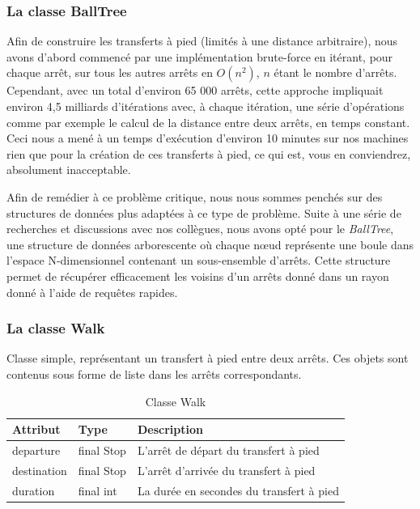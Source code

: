 \documentclass[12pt]{article}
\begin{document}
\subsubsection{La classe BallTree}
Afin de construire les transferts à pied (limités à une distance arbitraire), nous avons d'abord commencé par une implémentation brute-force en itérant, pour chaque arrêt, sur tous les
autres arrêts en $O(n^2)$, $n$ étant le nombre d'arrêts. Cependant, avec un total d'environ 65 000 arrêts, cette approche impliquait environ 4,5 milliards d'itérations avec, à chaque 
itération, une série d'opérations comme par exemple le calcul de la distance entre deux arrêts, en temps constant. Ceci nous a mené à un temps d'exécution d'environ 10 minutes sur nos 
machines rien que pour la création de ces transferts à pied, ce qui est, vous en conviendrez, absolument inacceptable.

Afin de remédier à ce problème critique, nous nous sommes penchés sur des structures de données plus adaptées à ce type de problème. Suite à une série de recherches et discussions avec
nos collègues, nous avons opté pour le \emph{BallTree}, une structure de données arborescente où chaque nœud représente une boule dans l'espace N-dimensionnel contenant un sous-ensemble d'arrêts.
Cette structure permet de récupérer efficacement les voisins d'un arrêts donné dans un rayon donné à l'aide de requêtes rapides.

\subsubsection{La classe Walk}
\label{sec:walk}
Classe simple, représentant un transfert à pied entre deux arrêts. Ces objets sont contenus sous forme de liste dans les arrêts correspondants.

\begin{table}[h]
    \centering
    \begin{tabular}{|l|l|p{8cm}|}
    \hline
    \textbf{Attribut} & \textbf{Type} & \textbf{Description} \\
    \hline
    departure & final Stop & L'arrêt de départ du transfert à pied \\
    destination & final Stop & L'arrêt d'arrivée du transfert à pied \\
    duration & final int & La durée en secondes du transfert à pied \\
    \hline
    \end{tabular}
    \caption{Classe Walk}
\end{table}
\end{document}
